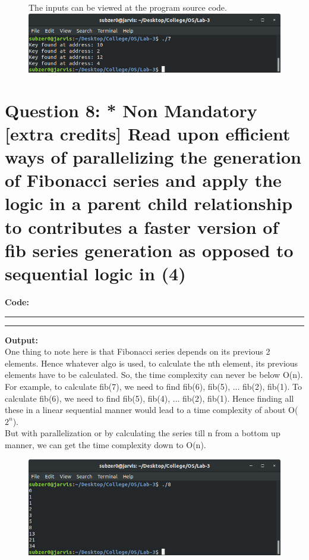 \documentclass{article}
\begin{document}
\begin{figure}[ht]
    The inputs can be viewed at the program source code.\\ 
    \includegraphics[width=\textwidth]{output/7.png}
\end{figure}

\section*{Question 8: * Non Mandatory [extra credits] Read upon efficient ways of parallelizing the generation of Fibonacci series and apply the logic in a parent child relationship to contributes a faster version of fib series generation as opposed to sequential logic in (4)}

\bigskip

\textbf{\LARGE Code:}
\smallskip
\par\noindent\rule{\textwidth}{0.4pt}

\par\noindent\rule{\textwidth}{0.4pt}

\bigskip
\noindent
\textbf{\LARGE Output:} \\
    One thing to note here is that Fibonacci series depends on its previous
    2 elements. Hence whatever algo is used, to calculate the nth element, 
    its previous elements have to be calculated. So, the time complexity 
    can never be below O(n). \\
    For example, to calculate fib(7), we need to find fib(6), fib(5), ... 
    fib(2), fib(1). To calculate fib(6), we need to find fib(5), fib(4), ... 
    fib(2), fib(1). Hence finding all these in a linear sequential manner would
    lead to a time complexity of about O($2^n$). \\
    But with parallelization or by calculating the series till n from a bottom up
    manner, we can get the time complexity down to O(n).
\begin{figure}[ht]
    \includegraphics[width=\textwidth]{output/8.png}
\end{figure}
\end{document}
